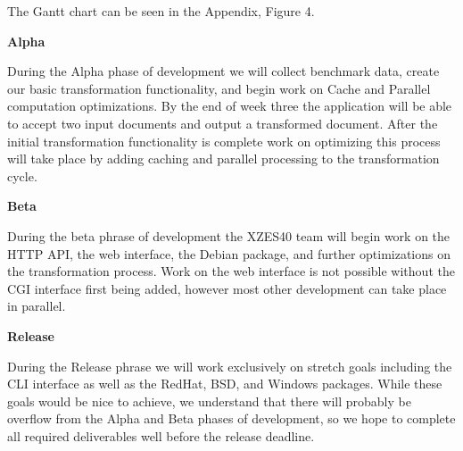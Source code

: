 The Gantt chart can be seen in the Appendix, Figure 4.

\textbf{Alpha}

During the Alpha phase of development we will collect benchmark data, create our basic transformation functionality, and begin work on Cache and Parallel computation optimizations.
By the end of week three the application will be able to accept two input documents and output a transformed document.
After the initial transformation functionality is complete work on optimizing this process will take place by adding caching and parallel processing to the transformation cycle.

\textbf{Beta}

During the beta phrase of development the XZES40 team will begin work on the HTTP API, the web interface, the Debian package, and further optimizations on the transformation process.
Work on the web interface is not possible without the CGI interface first being added, however most other development can take place in parallel.

\textbf{Release}

During the Release phrase we will work exclusively on stretch goals including the CLI interface as well as the RedHat, BSD, and Windows packages.
While these goals would be nice to achieve, we understand that there will probably be overflow from the Alpha and Beta phases of development, so we hope to complete all required deliverables well before the release deadline.


